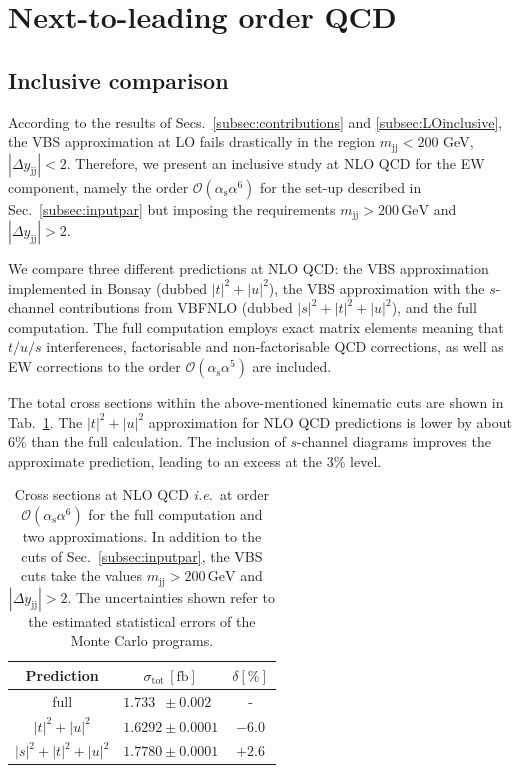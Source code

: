 \documentclass[twocolumn,epjc3]{svjour3} %
\newcommand{\Pj}{\ensuremath{\text{j}}\xspace}
\newcommand{\GeV}{\ensuremath{\,\text{GeV}}\xspace}
\newcommand{\alphas}{\ensuremath{\alpha_\text{s}}\xspace}
\begin{document}
\section{Next-to-leading order QCD}
    \label{sec:NLO}
    \subsection{Inclusive comparison}
        \label{subsec:NLOinclusive}
    According to the results of Secs.~\ref{subsec:contributions} and \ref{subsec:LOinclusive}, the VBS approximation at LO fails drastically in the region $m_{\Pj\Pj} < 200$ GeV, $|\Delta y_{\Pj\Pj}| < 2$.
    Therefore, we present an inclusive study at NLO QCD for the EW component, namely the order $\mathcal{O}(\alphas\alpha^6)$ for the set-up described in Sec.~\ref{subsec:inputpar} but imposing the requirements $m_{\Pj\Pj}>200 \GeV$ and $|\Delta y_{\Pj\Pj}|>2$.

    We compare three different predictions at NLO QCD: 
    the VBS approximation implemented in {\sc Bonsay} (dubbed $|t|^2+|u|^2$), the VBS approximation with the $s$-channel contributions from {\sc VBFNLO} (dubbed $|s|^2+|t|^2+|u|^2$), and the full computation.
    The full computation employs exact matrix elements meaning that $t/u/s$ interferences, factorisable and non-factorisable QCD corrections, as well as EW corrections to the order $\mathcal{O}(\alphas \alpha^5)$ are included.

    The total cross sections within the above-mentioned kinematic cuts are shown in Tab.~\ref{tab:crosssecINCLUSIVE}.
    The $|t|^2+|u|^2$ approximation for NLO QCD predictions is lower by about $6\%$ than the full calculation.
    The inclusion of $s$-channel diagrams improves the approximate prediction, leading to an excess at the $3\%$ level.

    \begin{table}
    \centering
    \begin{tabular}{c|c|c}
    Prediction & $\sigma_{\textrm{tot}}\,[\textrm{fb}]$ & $\delta [\%]$ \\
    \hline
    \hline
    full &  $1.733\phantom{0} \pm 0.002\phantom{0}$ & - \\
    \hline
    $|t|^2 + |u|^2$ & $1.6292 \pm 0.0001$  &  $-6.0$ \\
    \hline
    $|s|^2 + |t|^2 + |u|^2$ & $1.7780 \pm 0.0001$  & $+2.6$
    \end{tabular}
    \caption{Cross sections at NLO QCD \emph{i.e.}\ at order $\mathcal{O}(\alphas\alpha^6)$ for the full computation and two approximations.
    In addition to the cuts of Sec.~\protect\ref{subsec:inputpar}, the VBS cuts take the values $m_{\Pj\Pj}>200 \GeV$ and $|\Delta y_{\Pj\Pj}|>2$.
    The uncertainties shown refer to the estimated statistical errors of the Monte Carlo programs.}
    \label{tab:crosssecINCLUSIVE}
    \end{table}
\end{document}

